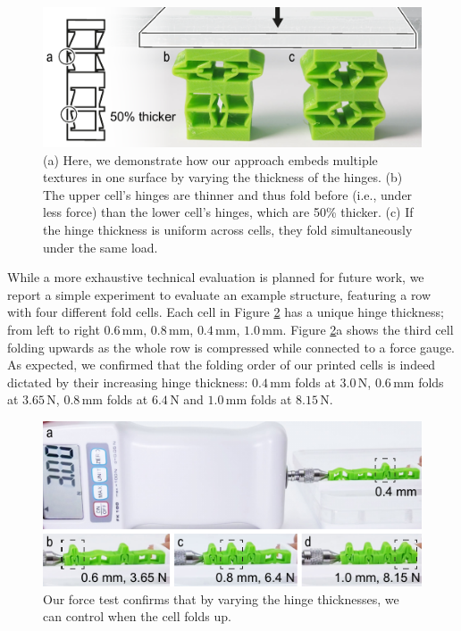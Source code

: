 \begin{figure} [h]  
    \includegraphics[width=\textwidth]{chapters/metamaterial-textures-FIG/10-force-dependent-cells.pdf}
    \caption[Short figure name.]{(a) Here, we demonstrate how our approach embeds multiple textures in one surface by varying the thickness of the hinges. (b) The upper cell’s hinges are thinner and thus fold before (i.e., under less force) than the lower cell’s hinges, which are 50\% thicker. (c) If the hinge thickness is uniform across cells, they fold simultaneously under the same load.
    \label{fig:10-force-dependent-cells}}
\end{figure}

While a more exhaustive technical evaluation is planned for future work, we report a simple experiment to evaluate an example structure, featuring a row with four different fold cells. Each cell in Figure \ref{fig:11-force-test} has a unique hinge thickness; from left to right  $0.6\, \mathrm{mm}$,  $0.8\, \mathrm{mm}$,  $0.4\, \mathrm{mm}$,  $1.0\, \mathrm{mm}$. Figure \ref{fig:11-force-test}a shows the third cell folding upwards as the whole row is compressed while connected to a force gauge. As expected, we confirmed that the folding order of our printed cells is indeed dictated by their increasing hinge thickness:  $0.4\, \mathrm{mm}$ folds at  $3.0\, \mathrm{N}$,  $0.6\, \mathrm{mm}$ folds at $3.65\, \mathrm{N}$, $0.8\, \mathrm{mm}$ folds at $6.4\, \mathrm{N}$ and $1.0\, \mathrm{mm}$ folds at $8.15\, \mathrm{N}$. 

\begin{figure} [h]  
    \includegraphics[width=\textwidth]{chapters/metamaterial-textures-FIG/11-force-test.pdf}
    \caption[Short figure name.]{Our force test confirms that by varying the hinge thicknesses, we can control when the cell folds up.
    \label{fig:11-force-test}}
\end{figure}


